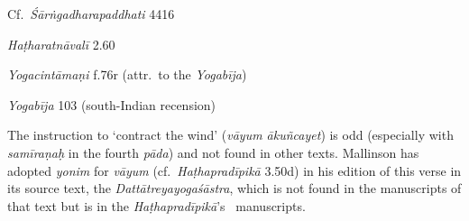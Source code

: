\begin{ekdosis}
\begin{sources}[hp03_052]
Cf.~\emph{Śārṅgadharapaddhati} 4416
\begin{versinnote}
\end{versinnote}
\end{sources}

\begin{testimonia}[hp03_052]
\emph{Haṭharatnāvalī} 2.60
\begin{versinnote}
\end{versinnote} 

\emph{Yogacintāmaṇi} f.76r (attr.~to the \emph{Yogabīja})
\begin{versinnote}
\end{versinnote}

\emph{Yogabīja} 103 (south-Indian recension)
\begin{versinnote}
\end{versinnote}

\end{testimonia}

\begin{philcomm}[hp03_052]
The instruction to `contract the wind' (\emph{vāyum ākuñcayet}) is odd (especially with \emph{samīraṇaḥ} in the fourth \emph{pāda}) and not found in other texts. Mallin\-son has adopted \emph{yonim} for \emph{vāyum} (cf.~\emph{Haṭhapradīpikā} 3.50d) in his edition of this verse in its source text, the \emph{Dattātreyayogaśāstra}, which is not found in the manuscripts of that text but is in the \emph{Haṭhapradīpikā}’s \delta \ manuscripts. 


\end{philcomm}
\end{ekdosis}
